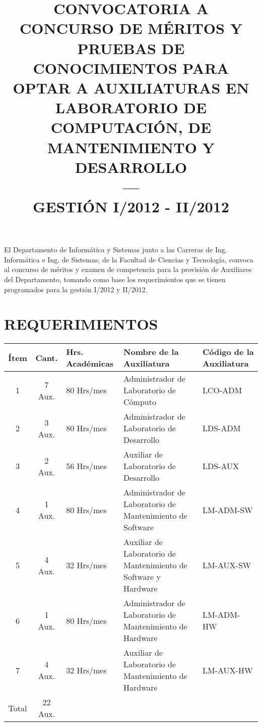 \documentclass[letterpaper,11pt]{article}
\title{CONVOCATORIA A CONCURSO DE MÉRITOS Y PRUEBAS DE CONOCIMIENTOS PARA OPTAR A AUXILIATURAS EN LABORATORIO DE COMPUTACIÓN, DE MANTENIMIENTO Y DESARROLLO \\ --- \\ GESTIÓN I/2012 - II/2012}
\date{}
\begin{document}
\maketitle
El Departamento de Informática y Sistemas junto a las Carreras de Ing. Informática e Ing. de Sistemas, de la Facultad de Ciencias y Tecnología, convoca al concurso de méritos y examen de competencia para la provisión de Auxiliares del Departamento, tomando como base los requerimientos que se tienen programados para la gestión I/2012 y II/2012.

\section{REQUERIMIENTOS}
\begin{tabular}{|c|c|p{2.8cm}|p{5.2cm}|p{2.8cm}|}
\hline
Ítem & Cant. & Hrs. Académicas & Nombre de la Auxiliatura & Código de la Auxiliatura \\
\hline
1 & 7 Aux. & 80 Hrs/mes & Administrador de Laboratorio de Cómputo & LCO-ADM \\
\hline
2 & 3 Aux. & 80 Hrs/mes & Administrador de Laboratorio de Desarrollo & LDS-ADM \\
\hline
3 & 2 Aux. & 56 Hrs/mes & Auxiliar de Laboratorio de Desarrollo & LDS-AUX \\
\hline
4 & 1 Aux. & 80 Hrs/mes & Administrador de Laboratorio de Mantenimiento de Software & LM-ADM-SW \\
\hline
5 & 4 Aux. & 32 Hrs/mes & Auxiliar de Laboratorio de Mantenimiento de Software y Hardware & LM-AUX-SW \\
\hline
6 & 1 Aux. & 80 Hrs/mes & Administrador de Laboratorio de Mantenimiento de Hardware & LM-ADM-HW \\
\hline
7 & 4 Aux. & 32 Hrs/mes & Auxiliar de Laboratorio de Mantenimiento de Hardware & LM-AUX-HW \\
\hline
Total & 22 Aux. & & & \\
\hline
\end{tabular}
\end{document}
